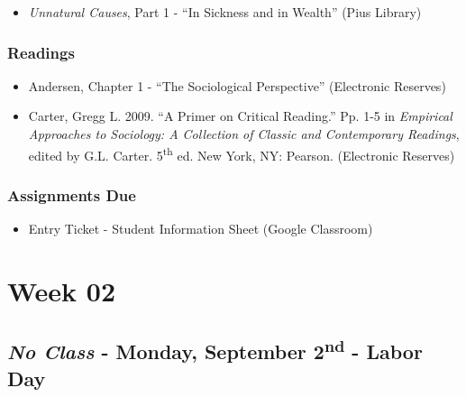 \documentclass[]{book}
\providecommand{\tightlist}{%
  \setlength{\itemsep}{0pt}\setlength{\parskip}{0pt}}
\begin{document}
\begin{itemize}
\tightlist
\item
  \emph{Unnatural Causes}, Part 1 - ``In Sickness and in Wealth'' (Pius Library)
\end{itemize}

\hypertarget{readings-1}{%
\subsubsection*{Readings}\label{readings-1}}

\begin{itemize}
\tightlist
\item
  Andersen, Chapter 1 - ``The Sociological Perspective'' (Electronic Reserves)
\item
  Carter, Gregg L. 2009. ``A Primer on Critical Reading.'' Pp. 1-5 in \emph{Empirical Approaches to Sociology: A Collection of Classic and Contemporary Readings}, edited by G.L. Carter. 5\textsuperscript{th} ed. New York, NY: Pearson. (Electronic Reserves)
\end{itemize}

\hypertarget{assignments-due}{%
\subsubsection*{Assignments Due}\label{assignments-due}}

\begin{itemize}
\tightlist
\item
  Entry Ticket - Student Information Sheet (Google Classroom)
\end{itemize}

\newpage

\hypertarget{week-02}{%
\section*{Week 02}\label{week-02}}

\hypertarget{no-class---monday-september-2nd---labor-day}{%
\subsection*{\texorpdfstring{\emph{No Class} - Monday, September 2\textsuperscript{nd} - Labor Day}{No Class - Monday, September 2nd - Labor Day}}\label{no-class---monday-september-2nd---labor-day}}
\end{document}
